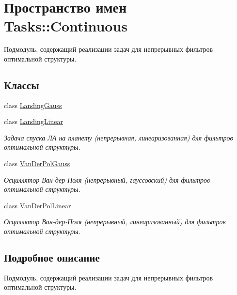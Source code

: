 \hypertarget{namespace_tasks_1_1_continuous}{}\section{Пространство имен Tasks\+:\+:Continuous}
\label{namespace_tasks_1_1_continuous}


Подмодуль, содержащий реализации задач для непрерывных фильтров оптимальной структуры.  


\subsection*{Классы}
\begin{DoxyCompactItemize}
\item 
class \hyperlink{class_tasks_1_1_continuous_1_1_landing_gauss}{Landing\+Gauss}
\item 
class \hyperlink{class_tasks_1_1_continuous_1_1_landing_linear}{Landing\+Linear}
\begin{DoxyCompactList}\small\item\em Задача спуска ЛА на планету (непрерывная, линеаризованная) для фильтров оптимальной структуры. \end{DoxyCompactList}\item 
class \hyperlink{class_tasks_1_1_continuous_1_1_van_der_pol_gauss}{Van\+Der\+Pol\+Gauss}
\begin{DoxyCompactList}\small\item\em Осциллятор Ван-\/дер-\/Поля (непрерывный, гауссовский) для фильтров оптимальной структуры. \end{DoxyCompactList}\item 
class \hyperlink{class_tasks_1_1_continuous_1_1_van_der_pol_linear}{Van\+Der\+Pol\+Linear}
\begin{DoxyCompactList}\small\item\em Осциллятор Ван-\/дер-\/Поля (непрерывный, линеаризованный) для фильтров оптимальной структуры. \end{DoxyCompactList}\end{DoxyCompactItemize}


\subsection{Подробное описание}
Подмодуль, содержащий реализации задач для непрерывных фильтров оптимальной структуры. 